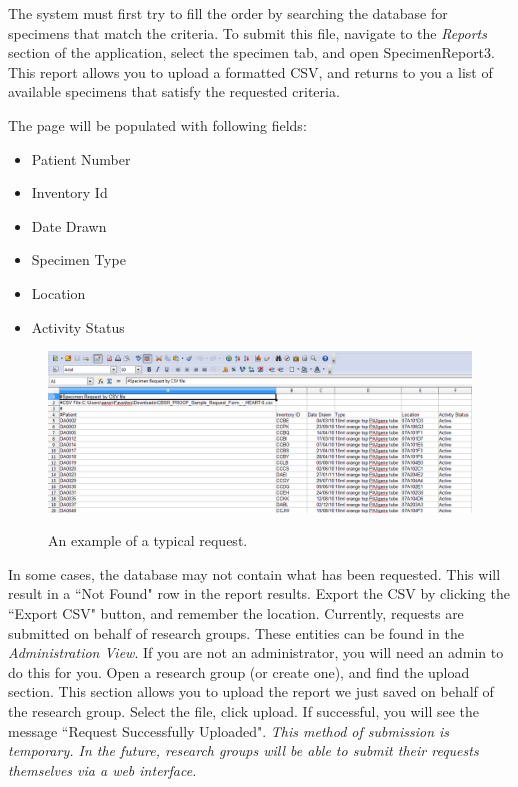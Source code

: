 The system must first try to fill the order by searching the database for specimens that match the criteria.  To submit this file, navigate to the \emph{Reports} section of the application, select the specimen tab, and open SpecimenReport3.  This report allows you to upload a formatted CSV, and returns to you a list of available specimens that satisfy the requested criteria.  
      
The page will be populated with following fields:
\begin{itemize}
\item Patient Number
\item Inventory Id
\item Date Drawn
\item Specimen Type
\item Location
\item Activity Status
\end{itemize}
    
\begin{figure}[H]
      \centering
      \scalebox{0.5}
      { \includegraphics*{screenshots/specimen_request/report_output.png} }
      \caption{An example of a typical request.}
      \label{Report Output}
\end{figure}
      
 In some cases, the database may not contain what has been requested.  This will result in a ``Not Found" row in the report results. Export the CSV by clicking the ``Export CSV" button, and remember the location. Currently, requests are submitted on behalf of research groups.  These entities can be found in the \emph{Administration View}.  If you are not an administrator, you will need an admin to do this for you.  Open a research group (or create one), and find the upload section.  This section allows you to upload the report we just saved on behalf of the research group.  Select the file, click upload.  If successful, you will see the message ``Request Successfully Uploaded".
 \emph{This method of submission is temporary.  In the future, research groups will be able to submit their requests themselves via a web interface.}
 
